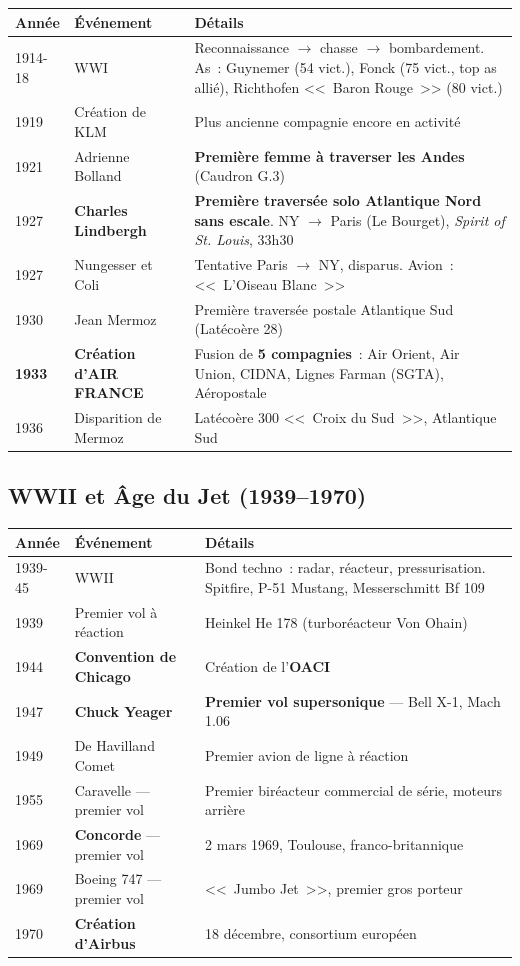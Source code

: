 \documentclass[11pt,a4paper]{article}
\begin{document}
\begin{longtable}{p{1cm}p{4cm}p{9.5cm}}
\toprule
\textbf{Année} & \textbf{Événement} & \textbf{Détails} \\
\midrule
1914-18 & WWI & Reconnaissance $\to$ chasse $\to$ bombardement. As~: Guynemer (54 vict.), Fonck (75 vict., top as allié), Richthofen <<~Baron Rouge~>> (80 vict.) \\
1919 & Création de KLM & Plus ancienne compagnie encore en activité \\
1921 & Adrienne Bolland & \textbf{Première femme à traverser les Andes} (Caudron G.3) \\
\rowcolor{aflight}
1927 & \textbf{Charles Lindbergh} & \textbf{Première traversée solo Atlantique Nord sans escale}. NY $\to$ Paris (Le Bourget), \textit{Spirit of St. Louis}, 33h30 \\
1927 & Nungesser et Coli & Tentative Paris $\to$ NY, disparus. Avion~: <<~L'Oiseau Blanc~>> \\
1930 & Jean Mermoz & Première traversée postale Atlantique Sud (Latécoère 28) \\
\rowcolor{aflight}
\textbf{1933} & \textbf{Création d'AIR FRANCE} & Fusion de \textbf{5 compagnies}~: Air Orient, Air Union, CIDNA, Lignes Farman (SGTA), Aéropostale \\
1936 & Disparition de Mermoz & Latécoère 300 <<~Croix du Sud~>>, Atlantique Sud \\
\bottomrule
\end{longtable}

\subsection{WWII et Âge du Jet (1939--1970)}

\begin{longtable}{p{1cm}p{4cm}p{9.5cm}}
\toprule
\textbf{Année} & \textbf{Événement} & \textbf{Détails} \\
\midrule
1939-45 & WWII & Bond techno~: radar, réacteur, pressurisation. Spitfire, P-51 Mustang, Messerschmitt Bf 109 \\
1939 & Premier vol à réaction & Heinkel He 178 (turboréacteur Von Ohain) \\
\rowcolor{aflight}
1944 & \textbf{Convention de Chicago} & Création de l'\textbf{OACI} \\
\rowcolor{aflight}
1947 & \textbf{Chuck Yeager} & \textbf{Premier vol supersonique} --- Bell X-1, Mach 1.06 \\
1949 & De Havilland Comet & Premier avion de ligne à réaction \\
1955 & Caravelle --- premier vol & Premier biréacteur commercial de série, moteurs arrière \\
\rowcolor{aflight}
1969 & \textbf{Concorde} --- premier vol & 2 mars 1969, Toulouse, franco-britannique \\
1969 & Boeing 747 --- premier vol & <<~Jumbo Jet~>>, premier gros porteur \\
\rowcolor{aflight}
1970 & \textbf{Création d'Airbus} & 18 décembre, consortium européen \\
\bottomrule
\end{longtable}
\end{document}
